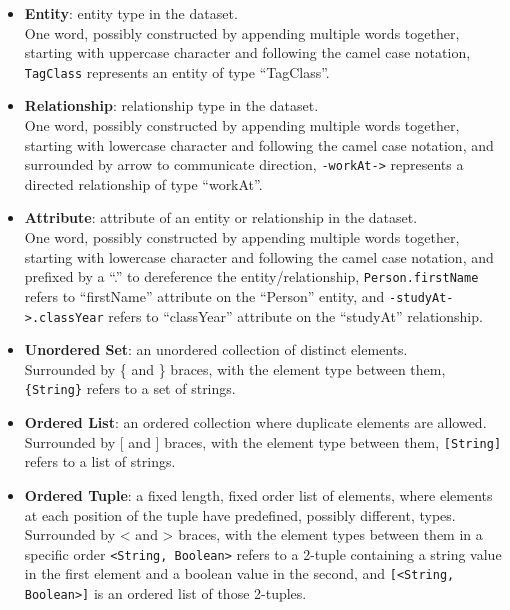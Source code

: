 \begin{itemize}
    \item \textbf{Entity}: entity type in the dataset.\\
        One word, possibly constructed by appending multiple words together, starting with uppercase character and following the camel case notation,
        \eg \texttt{TagClass} represents an entity of type ``TagClass''.
    \item \textbf{Relationship}: relationship type in the dataset.\\
        One word, possibly constructed by appending multiple words together, starting with lowercase character and following the camel case notation,
        and surrounded by arrow to communicate direction,
        \eg \mbox{\texttt{-workAt->}} represents a directed relationship of type ``workAt''.
    \item \textbf{Attribute}: attribute of an entity or relationship in the dataset.\\
        One word, possibly constructed by appending multiple words together, starting with lowercase character and following the camel case notation,
        and prefixed by a ``.'' to dereference the entity/relationship,
        \eg \texttt{Person.firstName} refers to ``firstName'' attribute on the ``Person'' entity,
        and \mbox{\texttt{-studyAt->.classYear}} refers to ``classYear'' attribute on the ``studyAt'' relationship.
    \item \textbf{Unordered Set}: an unordered collection of distinct elements.\\
        Surrounded by \{ and \} braces, with the element type between them,
        \eg \texttt{\{String\}} refers to a set of strings.
    \item \textbf{Ordered List}: an ordered collection where duplicate elements are allowed.\\
        Surrounded by [ and ] braces, with the element type between them,
        \eg \texttt{[String]} refers to a list of strings.
    \item \textbf{Ordered Tuple}: a fixed length, fixed order list of elements, where elements at each position of the tuple have predefined, possibly different, types. \\
        Surrounded by < and > braces, with the element types between them in a specific order
        \eg \texttt{<String, Boolean>} refers to a 2-tuple containing a string value in the first element and a boolean value in the second,
        and \texttt{[<String, Boolean>]} is an ordered list of those 2-tuples.
\end{itemize}

